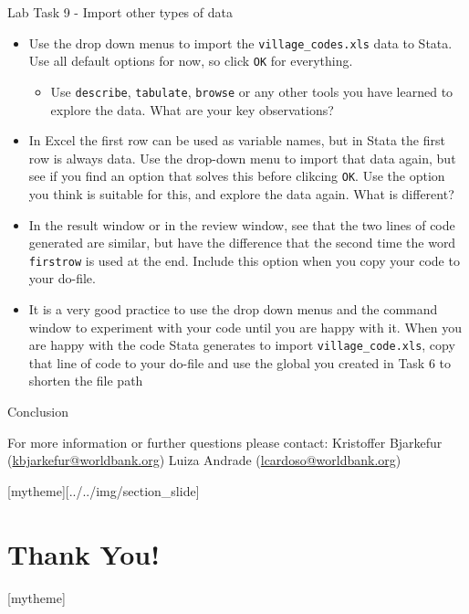 \documentclass[aspectratio=169]{beamer}
\newcommand{\sectionpic}[2]{
	\setbeamertemplate{section page}[mytheme][#2]
	\section{#1}
	\setbeamertemplate{section page}[mytheme]
}
\begin{document}
\begin{frame}{Lab Task 9 - Import other types of data}
	\begin{itemize}
		\item \small Use the drop down menus to import the \texttt{village\_codes.xls} data to Stata. Use all default options for now, so click \texttt{OK} for everything.
		\begin{itemize}
			\item \small Use \texttt{describe}, \texttt{tabulate}, \texttt{browse} or any other tools you have learned to explore the data. What are your key observations?
		\end{itemize}
		\item \small In Excel the first row can be used as variable names, but in Stata the first row is always data. Use the drop-down menu to import that data again, but see if you find an option that solves this before clikcing \texttt{OK}. Use the option you think is suitable for this, and explore the data again. What is different?
		\item \small In the result window or in the review window, see that the two lines of code generated are similar, but have the difference that the second time the word \texttt{firstrow} is used at the end. Include this option when you copy your code to your do-file.
		\item \small It is a very good practice to use the drop down menus and the command window to experiment with your code until you are happy with it. When you are happy with the code Stata generates to import \texttt{village\_code.xls}, copy that line of code to your do-file and use the global you created in Task 6 to shorten the file path
	\end{itemize}
\end{frame}

\begin{frame}{Conclusion}


\vspace{20mm}
For more information or further questions please contact:
\newline Kristoffer Bjarkefur (\url{kbjarkefur@worldbank.org}) \newline Luiza Andrade (\url{lcardoso@worldbank.org})

\end{frame}

\sectionpic{Thank You!}{../../img/section_slide}
\end{document}
